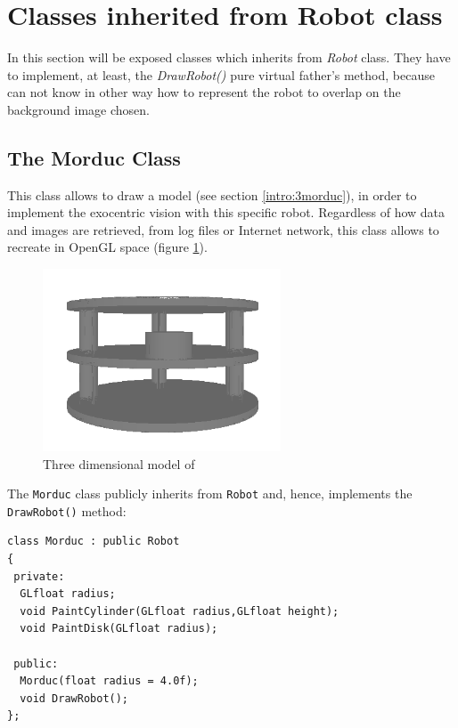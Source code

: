 \section{Classes inherited from Robot class}
\label{concr:robot_classes}

In this section will be exposed classes which inherits
from \textit{Robot} class. They have to implement, at least,
the \textit{DrawRobot()} pure virtual father's method,
because \framework{} can not know in other way how to
represent the robot to overlap on the background image chosen.

\subsection{The Morduc Class}
\label{concr:robot_classes:concr:morduc}

This class allows to draw a \morduc{} model (see section 
\ref{intro:3morduc}), in order to implement the exocentric
vision with this specific robot. Regardless of how data and images
are retrieved, from log files or Internet network, this class
allows to recreate \morduc{} in OpenGL space (figure
\ref{fig:3morduc_opengl}).

\begin{figure}[!h]
  \begin{center}
    \includegraphics[width=200pt]{img/3morduc_opengl.png}
    \caption{Three dimensional model of \morduc}
    \label{fig:3morduc_opengl}
  \end{center}
\end{figure}

The \texttt{Morduc} class publicly inherits from \texttt{Robot} 
and, hence, implements the \texttt{DrawRobot()} method:
\\
\begin{lstlisting}[caption={\texttt{Morduc} class declaration},
    label={code:morducclass}]
class Morduc : public Robot
{
 private:
  GLfloat radius;
  void PaintCylinder(GLfloat radius,GLfloat height);
  void PaintDisk(GLfloat radius);

 public:
  Morduc(float radius = 4.0f);
  void DrawRobot();
};
\end{lstlisting}

